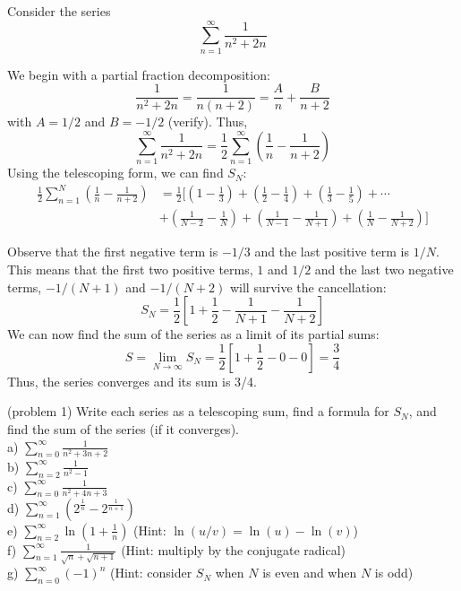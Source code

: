 \documentclass[handout]{ximera}
\begin{document}
\begin{example}[example 2]
Consider the series
\[
\sum_{n=1}^\infty \frac{1}{n^2 +2n}
\]

We begin with a partial fraction decomposition:
\[
\frac{1}{n^2 + 2n} = \frac{1}{n(n+2)} = \frac{A}{n} + \frac{B}{n+2}
\]
with $A = 1/2$ and $B=-1/2$ (verify). Thus,
\[
\sum_{n=1}^\infty \frac{1}{n^2 + 2n}  = \frac12 \sum_{n=1}^\infty \left( \frac{1}{n} - \frac{1}{n+2} \right)
\]
Using the telescoping form, we can find $S_N$:
\begin{align*}
 \frac12 \sum_{n=1}^N  \left(\frac{1}{n}-\frac{1}{n+2}\right) &= \frac12 \Bigg[\left(1 - \frac13 \right) + \left(\frac12 - \frac14 \right) 
 + \left(\frac13 - \frac15 \right) + \cdots \\
 & + \left(\frac{1}{N-2} - \frac{1}{N} \right) +\left(\frac{1}{N-1} - \frac{1}{N+1} \right) +\left(\frac{1}{N} - \frac{1}{N+2} \right) \Bigg]
\end{align*}

Observe that the first negative term is $-1/3$ and the last positive term is $1/N$. This means that the first two positive terms, 
$1$ and $1/2$ and the last two negative terms, $-1/(N+1)$ 
and $-1/(N+2)$  will survive the cancellation:
\[
S_N = \frac12 \left[ 1 + \frac12 - \frac{1}{N+1} - \frac{1}{N+2}\right]
\]
We can now find the sum of the series as a limit of its partial sums:
\[
S  = \lim_{N\to \infty} S_N = \frac12 \left[1 + \frac12 - 0- 0\right] =  \frac34
\]
Thus, the series converges and its sum is 3/4.
\end{example}



\begin{problem}(problem 1)
Write each series as a telescoping sum, find a formula for $S_N$, and find the sum of the series (if it converges).\\

a) $\displaystyle{\sum_{n=0}^\infty \frac{1}{n^2 + 3n + 2}   }$ \\
b) $\displaystyle{\sum_{n=2}^\infty \frac{1}{n^2 - 1}    }$\\
c) $\displaystyle{\sum_{n=0}^\infty \frac{1}{n^2 + 4n + 3}    }$\\
d) $\displaystyle{\sum_{n=1}^\infty \left( 2^{\frac{1}{n}} - 2^{\frac{1}{n+1}}\right) } $\\
e) $\displaystyle{\sum_{n=2}^\infty  \ln\left(1 + \frac{1}{n}\right)  }$ (Hint: $\ln(u/v) = \ln(u) - \ln(v)$) \\
f) $\displaystyle{\sum_{n=1}^\infty  \frac{1}{\sqrt n + \sqrt{n+1}}  }$ (Hint: multiply by the conjugate radical) \\
g) $\displaystyle{\sum_{n=0}^\infty  (-1)^n  }$ (Hint: consider $S_N$ when $N$ is even and when $N$ is odd)

\end{problem}
\end{document}
